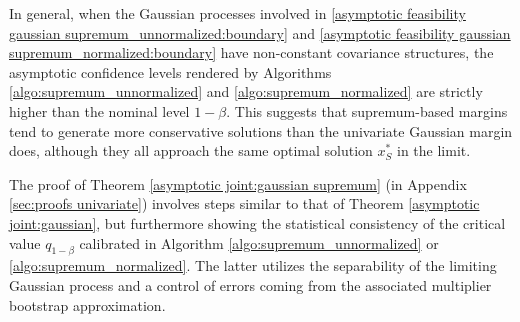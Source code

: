 \documentclass[mnsc,blindrev]{informs4} %
\begin{document}
In general, when the Gaussian processes involved in \eqref{asymptotic feasibility gaussian supremum_unnormalized:boundary} and \eqref{asymptotic feasibility gaussian supremum_normalized:boundary} have non-constant covariance structures, the asymptotic confidence levels rendered by Algorithms \ref{algo:supremum_unnormalized} and \ref{algo:supremum_normalized} are strictly higher than the nominal level $1-\beta$. This suggests that supremum-based margins tend to generate more conservative solutions than the univariate Gaussian margin does, although they all approach the same optimal solution $x_S^*$ in the limit.

The proof of Theorem \ref{asymptotic joint:gaussian supremum} (in Appendix \ref{sec:proofs univariate}) involves steps similar to that of Theorem \ref{asymptotic joint:gaussian}, but furthermore showing the statistical consistency of the critical value $q_{1-\beta}$ calibrated in Algorithm \ref{algo:supremum_unnormalized} or \ref{algo:supremum_normalized}. The latter utilizes the separability of the limiting Gaussian process and a control of errors coming from the associated multiplier bootstrap approximation.



\end{document}
